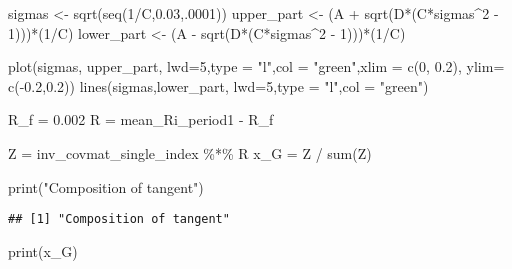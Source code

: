 \documentclass[
]{article}
\newenvironment{Shaded}{\begin{snugshade}}{\end{snugshade}}
\newcommand{\AttributeTok}[1]{\textcolor[rgb]{0.77,0.63,0.00}{#1}}
\newcommand{\DecValTok}[1]{\textcolor[rgb]{0.00,0.00,0.81}{#1}}
\newcommand{\FloatTok}[1]{\textcolor[rgb]{0.00,0.00,0.81}{#1}}
\newcommand{\FunctionTok}[1]{\textcolor[rgb]{0.00,0.00,0.00}{#1}}
\newcommand{\NormalTok}[1]{#1}
\newcommand{\OtherTok}[1]{\textcolor[rgb]{0.56,0.35,0.01}{#1}}
\newcommand{\SpecialCharTok}[1]{\textcolor[rgb]{0.00,0.00,0.00}{#1}}
\newcommand{\StringTok}[1]{\textcolor[rgb]{0.31,0.60,0.02}{#1}}
\begin{document}
\begin{Shaded}
\begin{Highlighting}[]
\NormalTok{sigmas }\OtherTok{\textless{}{-}} \FunctionTok{sqrt}\NormalTok{(}\FunctionTok{seq}\NormalTok{(}\DecValTok{1}\SpecialCharTok{/}\NormalTok{C,}\FloatTok{0.03}\NormalTok{,.}\DecValTok{0001}\NormalTok{)) }
\NormalTok{upper\_part }\OtherTok{\textless{}{-}}\NormalTok{ (A }\SpecialCharTok{+} \FunctionTok{sqrt}\NormalTok{(D}\SpecialCharTok{*}\NormalTok{(C}\SpecialCharTok{*}\NormalTok{sigmas}\SpecialCharTok{\^{}}\DecValTok{2} \SpecialCharTok{{-}} \DecValTok{1}\NormalTok{)))}\SpecialCharTok{*}\NormalTok{(}\DecValTok{1}\SpecialCharTok{/}\NormalTok{C) }
\NormalTok{lower\_part }\OtherTok{\textless{}{-}}\NormalTok{ (A }\SpecialCharTok{{-}} \FunctionTok{sqrt}\NormalTok{(D}\SpecialCharTok{*}\NormalTok{(C}\SpecialCharTok{*}\NormalTok{sigmas}\SpecialCharTok{\^{}}\DecValTok{2} \SpecialCharTok{{-}} \DecValTok{1}\NormalTok{)))}\SpecialCharTok{*}\NormalTok{(}\DecValTok{1}\SpecialCharTok{/}\NormalTok{C) }

\FunctionTok{plot}\NormalTok{(sigmas, upper\_part, }\AttributeTok{lwd=}\DecValTok{5}\NormalTok{,}\AttributeTok{type =} \StringTok{"l"}\NormalTok{,}\AttributeTok{col =} \StringTok{"green"}\NormalTok{,}\AttributeTok{xlim =} \FunctionTok{c}\NormalTok{(}\DecValTok{0}\NormalTok{, }\FloatTok{0.2}\NormalTok{), }\AttributeTok{ylim=} \FunctionTok{c}\NormalTok{(}\SpecialCharTok{{-}}\FloatTok{0.2}\NormalTok{,}\FloatTok{0.2}\NormalTok{)) }
\FunctionTok{lines}\NormalTok{(sigmas,lower\_part, }\AttributeTok{lwd=}\DecValTok{5}\NormalTok{,}\AttributeTok{type =} \StringTok{"l"}\NormalTok{,}\AttributeTok{col =} \StringTok{"green"}\NormalTok{)}

\NormalTok{R\_f }\OtherTok{=} \FloatTok{0.002}
\NormalTok{R }\OtherTok{=}\NormalTok{ mean\_Ri\_period1 }\SpecialCharTok{{-}}\NormalTok{ R\_f}

\NormalTok{Z }\OtherTok{=}\NormalTok{ inv\_covmat\_single\_index }\SpecialCharTok{\%*\%}\NormalTok{ R}
\NormalTok{x\_G }\OtherTok{=}\NormalTok{ Z }\SpecialCharTok{/} \FunctionTok{sum}\NormalTok{(Z)}

\FunctionTok{print}\NormalTok{(}\StringTok{"Composition of tangent"}\NormalTok{)}
\end{Highlighting}
\end{Shaded}

\begin{verbatim}
## [1] "Composition of tangent"
\end{verbatim}

\begin{Shaded}
\begin{Highlighting}[]
\FunctionTok{print}\NormalTok{(x\_G)}
\end{Highlighting}
\end{Shaded}
\end{document}
